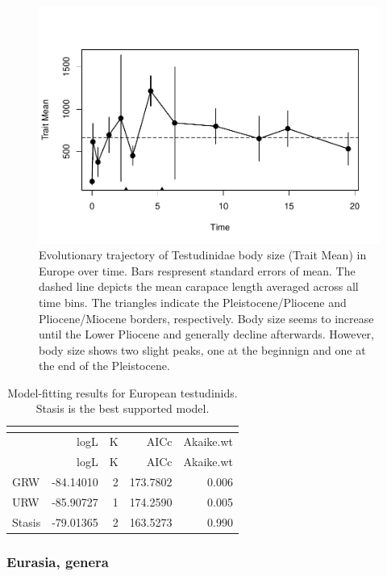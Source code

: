 \begin{figure}[H]
	\centering
	\includegraphics{MA_JJ_files/figure-latex/paleoTSEurope-1.pdf}
	\caption[PaleoTS plot of European \T]{Evolutionary trajectory of Testudinidae body size (Trait Mean) in Europe over time. Bars respresent standard errors of mean. The dashed line depicts the mean carapace length averaged across all time bins. The triangles indicate the Pleistocene/Pliocene and Pliocene/Miocene borders, respectively. Body size seems to increase until the Lower Pliocene and generally decline afterwards. However, body size shows two slight peaks, one at the beginnign and one at the end of the Pleistocene.}
	\label{fig:pTSEu}
\end{figure}

\begin{longtable}[]{@{}lrrrr@{}}
	\caption[Model fits for European \T]{Model-fitting results for European testudinids. Stasis is the best supported model.}
	\label{tab:pTSEuEM}\tabularnewline
	\toprule
	& logL & K & AICc & Akaike.wt\tabularnewline
	\midrule
	\endfirsthead
	\toprule
	& logL & K & AICc & Akaike.wt\tabularnewline
	\midrule
	\endhead
	GRW & -84.14010 & 2 & 173.7802 & 0.006\tabularnewline
	URW & -85.90727 & 1 & 174.2590 & 0.005\tabularnewline
	Stasis & -79.01365 & 2 & 163.5273 & 0.990\tabularnewline
	\bottomrule
\end{longtable}

\FloatBarrier



\subsubsection*{Eurasia, genera}\label{eurasia-genera}


